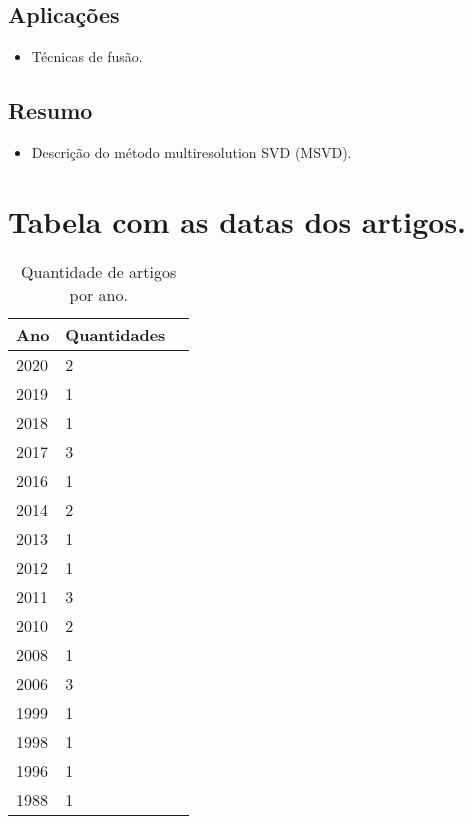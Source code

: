 \documentclass{article}
\begin{document}
\subsection{Aplicações}
\begin{itemize}
\item Técnicas de fusão.
\end{itemize}
\subsection{Resumo}
\begin{itemize}
\item Descrição do método multiresolution SVD (MSVD).
\end{itemize}
\section{Tabela com as datas dos artigos.}
\begin{table}[hbt]                                                                      \centering
        \caption{Quantidade de artigos por ano.}\label{tab01}
\begin{tabular}{@{}llr@{}} \toprule
        Ano & Quantidades  \\ \midrule                
        2020             & 2 \\          
        2019             & 1\\          
        2018             & 1\\          
        2017             & 3 \\          
        2016             & 1 \\          
        2014             & 2 \\
        2013             & 1 \\
        2012             & 1 \\          
        2011             & 3\\
        2010             & 2 \\
        2008             & 1\\          
        2006             & 3 \\
        1999             & 1\\          
        1998             & 1\\         
        1996             & 1 \\
        1988             & 1  \\     \bottomrule
\end{tabular}
\end{table}
\end{document}
